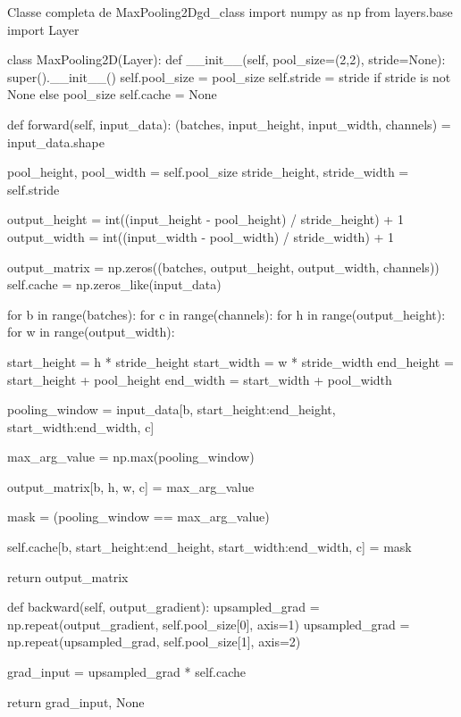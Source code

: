 \begin{codelisting}{Classe completa de MaxPooling2D}{gd_class}
import numpy as np
from layers.base import Layer

class MaxPooling2D(Layer):
    def __init__(self, pool_size=(2,2), stride=None):
        super().__init__()
        self.pool_size = pool_size
        self.stride = stride if stride is not None else pool_size
        self.cache = None

    def forward(self, input_data):
        (batches, input_height, input_width, channels) = input_data.shape

        pool_height, pool_width = self.pool_size
        stride_height, stride_width = self.stride

        output_height = int((input_height - pool_height) / stride_height) + 1
        output_width = int((input_width - pool_width) / stride_width) + 1

        output_matrix = np.zeros((batches, output_height, output_width, channels))
        self.cache = np.zeros_like(input_data)

        for b in range(batches):
            for c in range(channels):
                for h in range(output_height):
                    for w in range(output_width):

                        start_height = h * stride_height
                        start_width = w * stride_width
                        end_height = start_height + pool_height
                        end_width = start_width + pool_width

                        pooling_window = input_data[b, start_height:end_height, start_width:end_width, c]

                        max_arg_value = np.max(pooling_window)

                        output_matrix[b, h, w, c] = max_arg_value

                        mask = (pooling_window == max_arg_value)

                        self.cache[b, start_height:end_height, start_width:end_width, c] = mask

        return output_matrix

    def backward(self, output_gradient):
        upsampled_grad = np.repeat(output_gradient, self.pool_size[0], axis=1)
        upsampled_grad = np.repeat(upsampled_grad, self.pool_size[1], axis=2)

        grad_input = upsampled_grad * self.cache

        return grad_input, None

\end{codelisting}

